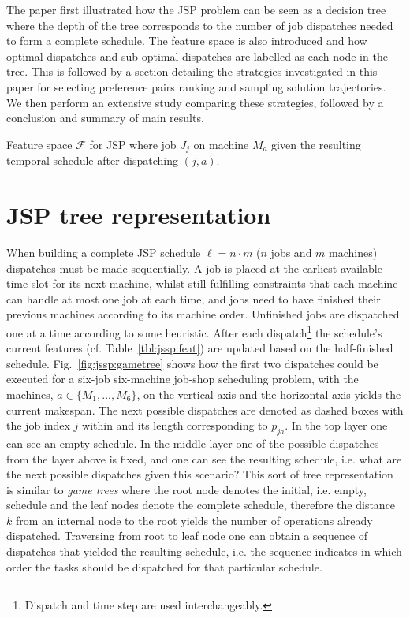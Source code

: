 \documentclass[smallextended]{llncs}
\newcommand{\citep}[1]{\cite{#1}}
\begin{document}
The paper first illustrated how the JSP problem can be seen as a decision tree where the depth of the tree corresponds 
to the number of job dispatches needed to form a complete schedule. The feature space is also introduced and how 
optimal dispatches and sub-optimal dispatches are labelled as each node in the tree. This is followed by a section 
detailing the strategies investigated in this paper for selecting preference pairs ranking and sampling solution 
trajectories. We then perform an extensive study comparing these strategies, followed by a conclusion and summary of 
main results.



\begin{table}  
  \caption{Feature space $\mathcal{F}$ for JSP where job $J_j$ on machine $M_a$ given the resulting temporal schedule after dispatching $(j,a)$.  }
  \label{tbl:jssp:feat}
  
\end{table}

\section{JSP tree representation}\label{sec:gen:gametree}
When building a complete JSP schedule $\ell=n\cdot m$ ($n$ jobs and $m$ machines) dispatches must be made 
sequentially. 
A job is placed at the earliest available time slot for its next machine, whilst still fulfilling constraints that each machine can handle at most one job at each time, and jobs need to have finished their previous machines according to its machine order. 
Unfinished jobs are dispatched one at a time according to some heuristic. After each dispatch\footnote{Dispatch and time step are used interchangeably.} the schedule's current features (cf. Table~\ref{tbl:jssp:feat}) are updated based on the half-finished schedule. 
Fig.~\ref{fig:jssp:gametree} shows how the first two dispatches could be executed for a six-job six-machine job-shop scheduling problem, with the machines, $a\in\{M_1,...,M_6\}$, on the vertical axis and the horizontal axis yields the current makespan. The next possible dispatches are denoted as dashed boxes with the job index $j$ within and its length corresponding to $p_{ja}$.
In the top layer one can see an empty schedule.
In the middle layer one of the possible dispatches from the layer above is fixed, and one can see the resulting 
schedule, i.e. what are the next possible dispatches given this scenario? This sort of tree representation is similar 
to \emph{game trees} \citep{Rosen03} where the root node denotes the initial, i.e. empty, schedule and the leaf nodes 
denote the complete schedule, therefore the distance $k$ from an internal node to the root yields the number of 
operations already dispatched. Traversing from root to leaf node one can obtain a sequence of dispatches that yielded 
the resulting schedule, i.e. the sequence indicates in which order the tasks should be dispatched for that particular 
schedule. 
\end{document}
